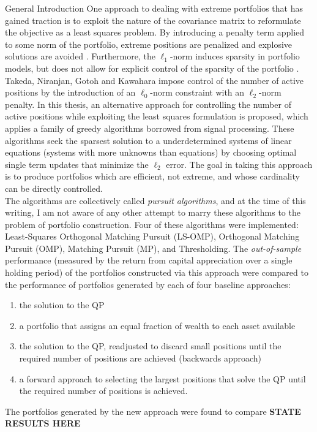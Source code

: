 \begin{section}{General Introduction}
One approach to dealing with extreme portfolios that has gained traction is to exploit the nature of the covariance matrix to reformulate the objective as a least squares problem. By introducing a penalty term applied to some norm of the portfolio, extreme positions are penalized and explosive solutions are avoided \cite{Carrascoa}. Furthermore, the $\ell_{1}$-norm induces sparsity in portfolio models, but does not allow for explicit control of the sparsity of the portfolio \cite{Takeda2013}. Takeda, Niranjan, Gotoh and Kawahara \cite{Takeda2013} impose control of the number of active positions by the introduction of an $\ell_{0}$-norm constraint with an $\ell_{2}$-norm penalty. In this thesis, an alternative approach for controlling the number of active positions while exploiting the least squares formulation is proposed, which applies a family of greedy algorithms borrowed from signal processing. These algorithms seek the sparsest solution to a underdetermined systems of linear equations (systems with more unknowns than equations) by choosing optimal single term updates that minimize the $\ell_{2}$ error. The goal in taking this approach is to produce portfolios which are efficient, not extreme, and whose cardinality can be directly controlled.\\

The algorithms are collectively called \textit{pursuit algorithms}, and at the time of this writing, I am not aware of any other attempt to marry these algorithms to the problem of portfolio construction. Four of these algorithms were implemented: Least-Squares Orthogonal Matching Pursuit (LS-OMP), Orthogonal Matching Pursuit (OMP), Matching Pursuit (MP), and Thresholding. The \textit{out-of-sample} performance (measured by the return from capital appreciation over a single holding period) of the portfolios constructed via this approach were compared to the performance of portfolios generated by each of four baseline approaches: 
\begin{enumerate}
\item the solution to the QP
\item a portfolio that assigns an equal fraction of wealth to each asset available
\item the solution to the QP, readjusted to discard small positions until the required number of positions are achieved (backwards approach)
\item a forward approach to selecting the largest positions that solve the QP until the required number of positions is achieved. 
\end{enumerate}
The portfolios generated by the new approach were found to compare \textbf{STATE RESULTS HERE}\\


\end{section}
